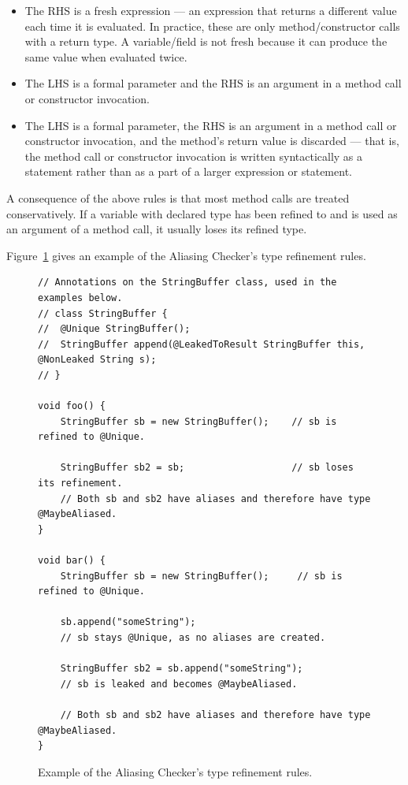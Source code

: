 \begin{itemize}
\item
The RHS is a fresh expression --- an expression that returns a different value
each time it is evaluated. In practice, these are only method/constructor calls
with a  return type. A variable/field is not fresh because it can
produce the same value when evaluated twice.
\item
The LHS is a  formal parameter and the RHS is an argument in a
method call or constructor invocation.
\item
The LHS is a  formal parameter, the RHS is an argument in
a method call or constructor invocation, and the method's return value is
discarded --- that is, the method call or constructor invocation is written
syntactically as a statement rather than as a part of a larger expression or
statement.
\end{itemize}

A consequence of the above rules is that most method calls are treated conservatively.
If a variable with declared type  has been refined
to  and is used as an argument of a method call, it usually loses its
 refined type.


Figure~\ref{fig-aliasing-refinement-example} gives an example of the Aliasing Checker's
type refinement rules.

\begin{figure}
\begin{smaller}
\begin{Verbatim}
// Annotations on the StringBuffer class, used in the examples below.
// class StringBuffer {
//  @Unique StringBuffer();
//  StringBuffer append(@LeakedToResult StringBuffer this, @NonLeaked String s);
// }

void foo() {
    StringBuffer sb = new StringBuffer();    // sb is refined to @Unique.

    StringBuffer sb2 = sb;                   // sb loses its refinement.
    // Both sb and sb2 have aliases and therefore have type @MaybeAliased.
}

void bar() {
    StringBuffer sb = new StringBuffer();     // sb is refined to @Unique.

    sb.append("someString");
    // sb stays @Unique, as no aliases are created.

    StringBuffer sb2 = sb.append("someString");
    // sb is leaked and becomes @MaybeAliased.

    // Both sb and sb2 have aliases and therefore have type @MaybeAliased.
}

\end{Verbatim}
\end{smaller}
\caption{Example of the Aliasing Checker's type refinement rules.}
\label{fig-aliasing-refinement-example}
\end{figure}

